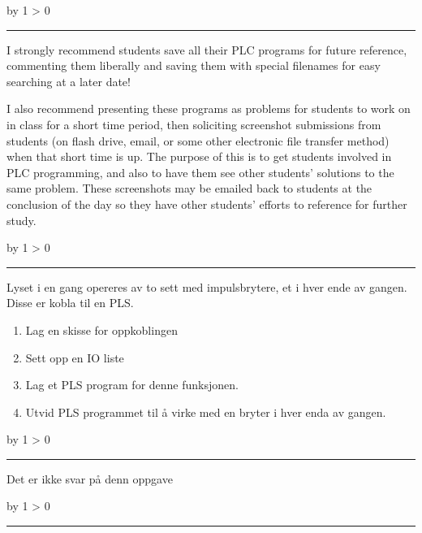 \documentclass[12pt,a4paper]{article}
\def\oppgave{
            \advance\questnum by 1
            \ifnum \questnum > 0
                 \hrule
                 \vskip 3pt
                 \leftline{Oppgave \the\questnum}
                 \vskip 3pt \fi}
\def\svar{
           \advance\answnum by 1
           \ifnum \answnum > 0
                \hrule
                \vskip 3pt
                \leftline{Svar \the\answnum}
                \vskip 3pt \fi}
\def\notes{
           \advance\explnum by 1
           \ifnum \explnum > 0
                \hrule
                \vskip 3pt
                \leftline{Notes \the\explnum}
                \vskip 3pt \fi}
\begin{document}
\notes{} 

I strongly recommend students save all their PLC programs for future reference, commenting them liberally and saving them with special filenames for easy searching at a later date!

\vskip 10pt

I also recommend presenting these programs as problems for students to work on in class for a short time period, then soliciting screenshot submissions from students (on flash drive, email, or some other electronic file transfer method) when that short time is up.  The purpose of this is to get students involved in PLC programming, and also to have them see other students' solutions to the same problem.  These screenshots may be emailed back to students at the conclusion of the day so they have other students' efforts to reference for further study.


\vfil \eject 





\oppgave{} 

Lyset i en gang opereres av to sett med impulsbrytere, et i hver ende
av gangen. Disse er kobla til en PLS.
\begin{enumerate}
\item Lag en skisse for oppkoblingen
\item Sett opp en IO liste
\item Lag et PLS program for denne funksjonen.
\item Utvid PLS programmet til å virke med en bryter i hver enda av gangen. 
\end{enumerate}
\vskip 10pt
\vskip 10pt \filbreak 





\svar{} 
Det er ikke svar på denn oppgave
\vskip 10pt \filbreak 





\notes{} 



\vfil \eject 
\end{document}

